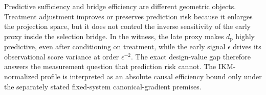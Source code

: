 Predictive sufficiency and bridge efficiency are different geometric objects. Treatment adjustment improves or preserves prediction risk because it enlarges the projection space, but it does not control the inverse sensitivity of the early proxy inside the selection bridge. In the witness, the late proxy makes \(d_{\mathrm p}\) highly predictive, even after conditioning on treatment, while the early signal \(\epsilon\) drives its observational score variance at order \(\epsilon^{-2}\). The exact design-value gap therefore answers the measurement question that prediction risk cannot. The IKM-normalized profile is interpreted as an absolute causal efficiency bound only under the separately stated fixed-system canonical-gradient premises.
